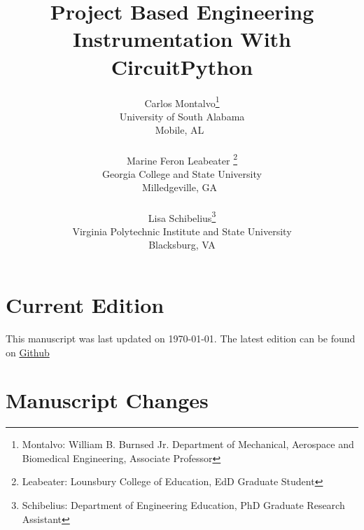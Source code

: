 \documentclass{article}
\begin{document}
\title{Project Based Engineering Instrumentation With CircuitPython}
\author{Carlos Montalvo\footnote{Montalvo: William B. Burnsed Jr. Department of Mechanical, Aerospace and Biomedical Engineering, Associate Professor}
  \\University of South Alabama\\Mobile, AL\ \\ \ \\Marine Feron Leabeater \footnote{Leabeater: Lounsbury College of Education, EdD Graduate Student}\\Georgia College and State University \\ Milledgeville, GA\ \\ \ \\Lisa Schibelius\footnote{Schibelius: Department of Engineering Education, PhD Graduate Research Assistant}\\
Virginia Polytechnic Institute and State University\\Blacksburg, VA}

\maketitle

\linespread{1}

\newpage

\section*{Current Edition}

This manuscript was last updated on \today. 
The latest edition can be found on \href{https://github.com/cmontalvo251/LaTeX/blob/master/PBL_CircuitPython_Instrumentation/main.pdf}{Github}

\section*{Manuscript Changes}
\end{document}
